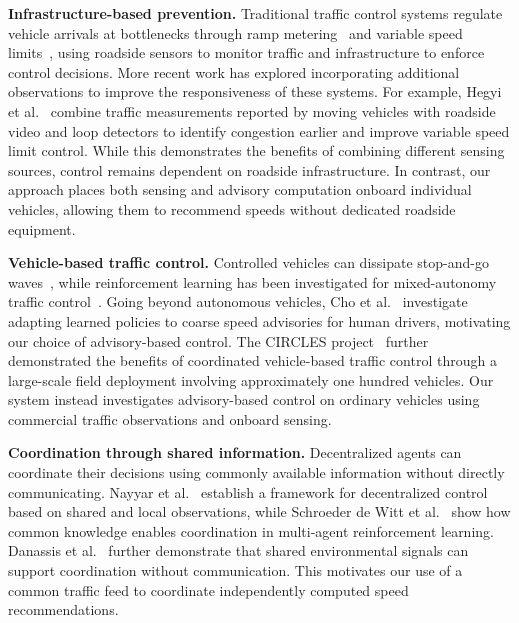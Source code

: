 \documentclass[letterpaper, 10pt, journal, twoside]{IEEEtran}
\begin{document}
\noindent\textbf{Infrastructure-based prevention.} Traditional traffic control systems regulate vehicle arrivals at bottlenecks through ramp metering~\cite{papageorgiou2002freeway,arnold1998ramp} and variable speed limits~\cite{hegyi2008specialist,li2017reinforcement}, using roadside sensors to monitor traffic and infrastructure to enforce control decisions. More recent work has explored incorporating additional observations to improve the responsiveness of these systems. For example, Hegyi et al.~\cite{hegyi2013cooperative} combine traffic measurements reported by moving vehicles with roadside video and loop detectors to identify congestion earlier and improve variable speed limit control. While this demonstrates the benefits of combining different sensing sources, control remains dependent on roadside infrastructure. In contrast, our approach places both sensing and advisory computation onboard individual vehicles, allowing them to recommend speeds without dedicated roadside equipment.

\noindent\textbf{Vehicle-based traffic control.} Controlled vehicles can dissipate stop-and-go waves~\cite{stern2018dissipation}, while reinforcement learning has been investigated for mixed-autonomy traffic control~\cite{wu2017flow,vinitsky2018benchmarks,kreidieh2018dissipating,self_regulating_cars}. Going beyond autonomous vehicles, Cho et al.~\cite{cho2023temporal} investigate adapting learned policies to coarse speed advisories for human drivers, motivating our choice of advisory-based control. The CIRCLES project~\cite{lee2024traffic} further demonstrated the benefits of coordinated vehicle-based traffic control through a large-scale field deployment involving approximately one hundred vehicles. Our system instead investigates advisory-based control on ordinary vehicles using commercial traffic observations and onboard sensing.

\noindent\textbf{Coordination through shared information.} Decentralized agents can coordinate their decisions using commonly available information without directly communicating. Nayyar et al.~\cite{nayyar2013common} establish a framework for decentralized control based on shared and local observations, while Schroeder de Witt et al.~\cite{schroeder2019common} show how common knowledge enables coordination in multi-agent reinforcement learning. Danassis et al.~\cite{danassis2022environmental} further demonstrate that shared environmental signals can support coordination without communication. This motivates our use of a common traffic feed to coordinate independently computed speed recommendations.
\end{document}
